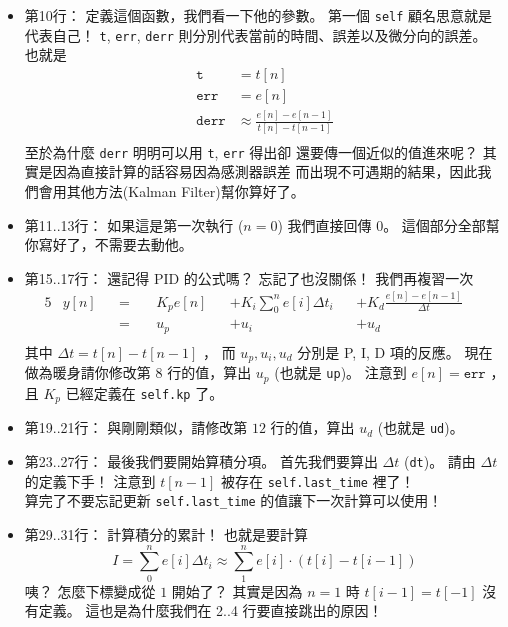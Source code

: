 \documentclass[12pt, a4paper]{article}
\begin{document}
\begin{itemize}
  \itemsep=0pt
  \item 第10行： 定義這個函數，我們看一下他的參數。 第一個 \texttt{self} 
    顧名思意就是代表自己！ \texttt{t}, \texttt{err}, \texttt{derr}
    則分別代表當前的時間、誤差以及微分向的誤差。 也就是
    \begin{align*}
      \texttt{t} &= t[n] \\
      \texttt{err} &= e[n] \\
      \texttt{derr} &\approx \frac{e[n] - e[n-1]}{t[n] - t[n-1]} \\
    \end{align*}
    至於為什麼 \texttt{derr} 明明可以用 \texttt{t}, \texttt{err} 得出卻
    還要傳一個近似的值進來呢？ 其實是因為直接計算的話容易因為感測器誤差
    而出現不可遇期的結果，因此我們會用其他方法(Kalman Filter)幫你算好了。

  \item 第11..13行： 如果這是第一次執行 ($n = 0$) 我們直接回傳 $0$。
    這個部分全部幫你寫好了，不需要去動他。

  \item 第15..17行：
    還記得 PID 的公式嗎？ 忘記了也沒關係！ 我們再複習一次
    \begin{alignat*}{5}
      & y[n] &&= \;&&K_p e[n] &&+ K_i \sum_0^{n} e[i] \Delta t_i&&+ K_d \frac{e[n] - e[n-1]}{\Delta t} &&\\
      &    &&= \;&&u_p        &&+ u_i                         &&+ u_d &&\\
    \end{alignat*}
    其中 $\Delta t = t[n] - t[n-1]$ ， 而 $u_p, u_i, u_d$ 分別是 P, I, D 項的反應。
    現在做為暖身請你修改第 $8$ 行的值，算出 $u_p$ (也就是 \texttt{up})。
    注意到 $e[n] = \texttt{err}$ ， 且 $K_p$ 已經定義在 \texttt{self.kp} 了。

  \item 第19..21行：
    與剛剛類似，請修改第 $12$ 行的值，算出 $u_d$ (也就是 \texttt{ud})。

  \item 第23..27行：
    最後我們要開始算積分項。 首先我們要算出 $\Delta t$ (\texttt{dt})。
    請由 $\Delta t$ 的定義下手！ 注意到 $t[n-1]$ 被存在 \texttt{self.last_time}
    裡了！\\
    算完了不要忘記更新 \texttt{self.last_time} 的值讓下一次計算可以使用！

  \item 第29..31行：
    計算積分的累計！ 也就是要計算
    \[ I = \sum_0^n e[i] \Delta t_i \approx \sum_1^n e[i] \cdot (t[i] - t[i-1]) \]
    咦？ 怎麼下標變成從 $1$ 開始了？ 其實是因為 $n = 1$ 時 $t[i-1] = t[-1]$ 
    沒有定義。 這也是為什麼我們在 2..4 行要直接跳出的原因！


\end{itemize}
\end{document}
